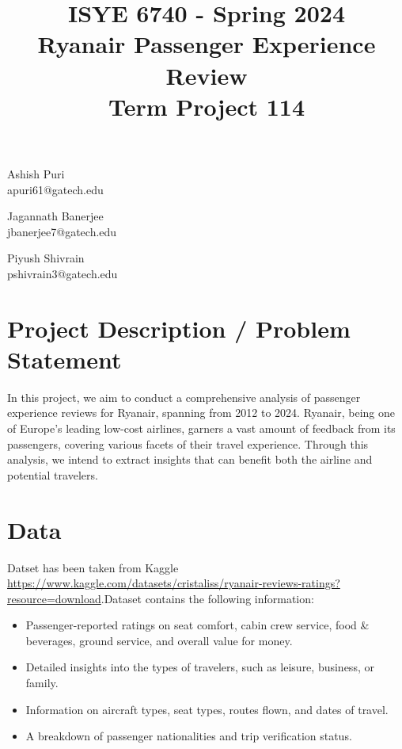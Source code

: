 \documentclass[11pt]{article} %
\title{\textbf{ISYE 6740 - Spring 2024 \\ Ryanair Passenger Experience Review \\Term Project 114 }}
\date{}
\begin{document}
\maketitle
\begin{center}
\begin{minipage}{0.33\textwidth}
    \centering
    {\Large Ashish Puri} \\
    apuri61@gatech.edu \\
\end{minipage}%
\begin{minipage}{0.33\textwidth}
    \centering
    {\Large Jagannath Banerjee} \\
    jbanerjee7@gatech.edu \\
\end{minipage}
\begin{minipage}{0.33\textwidth}
    \centering
    {\Large Piyush Shivrain} \\
    pshivrain3@gatech.edu \\
\end{minipage}
\end{center}

\section{Project Description / Problem Statement}
In this project, we aim to conduct a comprehensive analysis of passenger experience reviews for Ryanair, spanning from 2012 to 2024. Ryanair, being one of Europe's leading low-cost airlines, garners a vast amount of feedback from its passengers, covering various facets of their travel experience. Through this analysis, we intend to extract insights that can benefit both the airline and potential travelers.

\section{Data}
Datset has been taken from Kaggle \href{https://www.kaggle.com/datasets/cristaliss/ryanair-reviews-ratings?resource=download}{https://www.kaggle.com/datasets/cristaliss/ryanair-reviews-ratings?resource=download}.Dataset contains the following information:
\begin{itemize}
    \item Passenger-reported ratings on seat comfort, cabin crew service, food \& beverages, ground service, and overall value for money.
    \item Detailed insights into the types of travelers, such as leisure, business, or family.
    \item Information on aircraft types, seat types, routes flown, and dates of travel.
    \item A breakdown of passenger nationalities and trip verification status.
\end{itemize}
\end{document}
